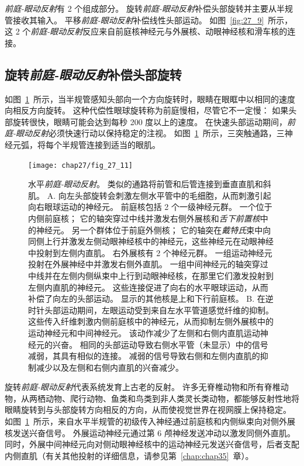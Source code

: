 \textit{前庭-眼动反射}有 2 个组成部分。
旋转\textit{前庭-眼动反射}补偿头部旋转并主要从半规管接收其输入。
平移\textit{前庭-眼动反射}补偿线性头部运动。
如图~\ref{fig:27_9}~所示，这 2 个\textit{前庭-眼动反射}反应来自前庭核神经元与外展核、动眼神经核和滑车核的连接。



\subsection{旋转\textit{前庭-眼动反射}补偿头部旋转}

如图~\ref{fig:27_11}~所示，当半规管感知头部向一个方向旋转时，眼睛在眼眶中以相同的速度向相反方向旋转。
这种代偿性眼球旋转称为前庭慢相，尽管它不一定慢：
如果头部旋转很快，眼睛可能会达到每秒 200 度以上的速度。
在快速头部运动期间，\textit{前庭-眼动反射}必须快速行动以保持稳定的注视。
如图~\ref{fig:27_11}~所示，三突触通路，三神经元弧，将每个半规管连接到适当的眼肌。


\begin{figure}[htbp]
	\centering
	\texttt{[image: chap27/fig\_27\_11]}
	\caption{水平\textit{前庭-眼动反射}。
		类似的通路将前管和后管连接到垂直直肌和斜肌。
		A. 向左头部旋转会刺激左侧水平管中的毛细胞，从而刺激引起向右眼球运动的神经元。
		前庭核包括 2 个一级神经元群。
		一个位于内侧前庭核；
		它的轴突穿过中线并激发右侧外展核和\textit{舌下前置核}中的神经元。
		另一个群体位于前庭外侧核；
		它的轴突在\textit{戴特氏}束中向同侧上行并激发左侧动眼神经核中的神经元，这些神经元在动眼神经中投射到左侧内直肌。
		右外展核有 2 个神经元群。
		一组运动神经元投射在外展神经中并激发右侧外直肌。
		一组中间神经元的轴突穿过中线并在左侧内侧纵束中上行到动眼神经核，在那里它们激发投射到左侧内直肌的神经元。
		这些连接促进了向右的水平眼球运动，从而补偿了向左的头部运动。
		显示的其他核是上和下行前庭核。
		B. 在逆时针头部运动期间，左眼运动受到来自左水平管道感觉纤维的抑制。
		这些传入纤维刺激内侧前庭核中的神经元，从而抑制左侧外展核中的运动神经元和中间神经元。
		该动作减少了左侧和右侧内直肌运动神经元的兴奋。
		相同的头部运动导致右侧水平管（未显示）中的信号减弱，其具有相似的连接。
		减弱的信号导致右侧和左侧内直肌的抑制减少以及左侧和右侧内直肌的兴奋减少\cite{sugiuchi2005vestibular}。}
	\label{fig:27_11}
\end{figure}


旋转\textit{前庭-眼动反射}代表系统发育上古老的反射。
许多无脊椎动物和所有脊椎动物，从两栖动物、爬行动物、鱼类和鸟类到非人类灵长类动物，都能够反射性地将眼睛旋转到与头部旋转方向相反的方向，从而使视觉世界在视网膜上保持稳定。
如图~\ref{fig:27_11}~所示，来自水平半规管的初级传入神经通过前庭核和内侧纵束向对侧外展核发送兴奋信号。
外展运动神经元通过第 6 颅神经发送冲动以激发同侧外直肌。
同时，外展中间神经元向对侧动眼神经核中的运动神经元发送兴奋信号，后者支配内侧直肌（有关其他投射的详细信息，请参见第~\ref{chap:chap35}~章）。


